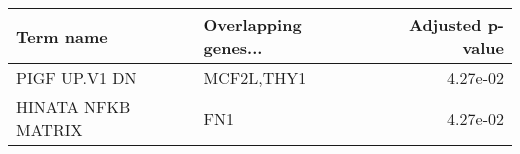 \begin{tabular}{llr}
\toprule
         Term name & Overlapping genes... &  Adjusted p-value \\
\midrule
     PIGF UP.V1 DN &           MCF2L,THY1 &          4.27e-02 \\
HINATA NFKB MATRIX &                  FN1 &          4.27e-02 \\
\bottomrule
\end{tabular}
